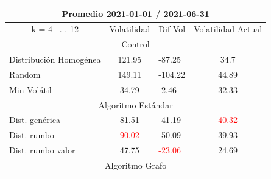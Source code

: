 \documentclass[12pt,a4paper]{article}
\begin{document}
\begin{table}[H]
\centering
\begin{tabular}{l|c|l|c|} 
\hline
\multicolumn{4}{c}{{\cellcolor[rgb]{0.635,0.647,0.788}}Promedio 2021-01-01 / 2021-06-31}                                                                                             \\ 
\hline
\multicolumn{1}{c|}{{\cellcolor[rgb]{0.635,0.647,0.788}}k = 4~ . . 12} & Volatilidad                       & Dif Vol                            & Volatilidad Actual                 \\ 
\hline
\multicolumn{4}{c}{{\cellcolor[rgb]{0.796,0.808,0.984}}Control}                                                                                                                      \\ 
\hline
\rowcolor[rgb]{0.925,0.957,1} Distribución Homogénea                   & 121.95                            & -87.25                             & 34.7                               \\
\rowcolor[rgb]{0.855,0.91,0.988} Random                                & 149.11                            & -104.22                            & 44.89                              \\
\rowcolor[rgb]{0.925,0.957,1} Min Volátil                              & 34.79                             & -2.46                              & 32.33                              \\ 
\hline
\multicolumn{4}{c}{{\cellcolor[rgb]{0.796,0.808,0.984}}Algoritmo Estándar}                                                                                                           \\ 
\hline
\rowcolor[rgb]{0.925,0.957,1} Dist. genérica                           & 81.51                             & -41.19                             & \textcolor{red}{40.32}             \\
\rowcolor[rgb]{0.855,0.91,0.988} Dist. rumbo                           & \textcolor{red}{90.02}            & \textcolor[rgb]{0,0.502,0}{-50.09} & 39.93                              \\
\rowcolor[rgb]{0.925,0.957,1} Dist. rumbo valor                        & \textcolor[rgb]{0,0.502,0}{47.75} & \textcolor{red}{-23.06}            & 24.69                              \\ 
\hline
\multicolumn{4}{c}{{\cellcolor[rgb]{0.796,0.808,0.984}}Algoritmo Grafo}                                                                                                              \\ 

\end{tabular}
\end{table}
\end{document}
